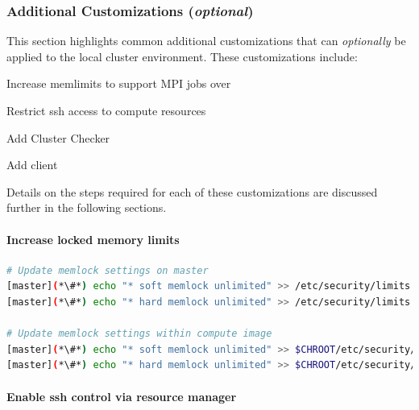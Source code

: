 \documentclass[letterpaper]{article}
\begin{document}
\subsubsection{Additional Customizations ({\em optional})} \label{sec:addl_customizations}

This section highlights common additional customizations that
can {\em optionally} be applied to the
local cluster environment. These customizations include:

\begin{itemize*}
\item Increase memlimits to support MPI jobs over \InfiniBand{}
\item Restrict ssh access to compute resources
\item Add Cluster Checker
\item Add \Lustre{} client
\end{itemize*}

\noindent Details on the steps required for each of these customizations are
discussed further in the following sections.

\paragraph{Increase locked memory limits}

 

\begin{lstlisting}[language=bash,keywords={},upquote=true]
# Update memlock settings on master
[master](*\#*) echo "* soft memlock unlimited" >> /etc/security/limits.conf
[master](*\#*) echo "* hard memlock unlimited" >> /etc/security/limits.conf

# Update memlock settings within compute image
[master](*\#*) echo "* soft memlock unlimited" >> $CHROOT/etc/security/limits.conf
[master](*\#*) echo "* hard memlock unlimited" >> $CHROOT/etc/security/limits.conf
\end{lstlisting}


\paragraph{Enable ssh control via resource manager} 
\end{document}

